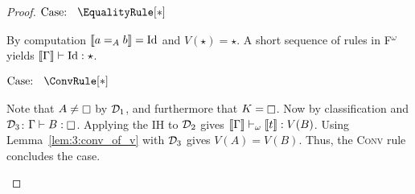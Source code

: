 \begin{proof}
    $\text{Case: }\begin{array}{c} \EqualityRule[*] \end{array}$
    \begin{proofcase}
        By computation $\llbracket a =_A b \rrbracket = \text{Id}$ and $V(\star) = \star$.
        A short sequence of rules in F$^\omega$ yields $\llbracket \Gamma \rrbracket \vdash \text{Id} : \star$.
    \end{proofcase}

    $\text{Case: }\begin{array}{c} \ConvRule[*] \end{array}$
    \begin{proofcase}
        Note that $A \neq \kind$ by $\mathcal{D}_{1}$, and furthermore that $K = \kind$.
        Now by classification and $\mathcal{D}_{3}$: $\Gamma \vdash B : \kind$.
        Applying the IH to $\mathcal{D}_{2}$ gives $\llbracket \Gamma \rrbracket \vdash_\omega \llbracket t \rrbracket : V(B)$.
        Using Lemma~\ref{lem:3:conv_of_v} with $\mathcal{D}_{3}$ gives $V(A) = V(B)$.
        Thus, the \textsc{Conv} rule concludes the case.
    \end{proofcase}
\end{proof}

